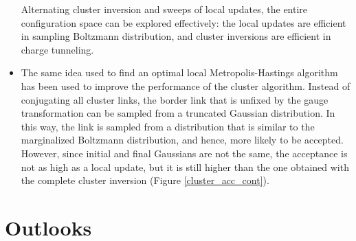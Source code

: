 \begin{itemize}
        Alternating cluster inversion and sweeps of local updates, the entire configuration space can be explored effectively:
        the local updates are efficient in sampling Boltzmann distribution, and cluster inversions are efficient in charge tunneling.
    \item
        The same idea used to find an optimal local Metropolis-Hastings algorithm has been used to improve the performance of the cluster algorithm.
        Instead of conjugating all cluster links, the border link that is unfixed by the gauge transformation can be sampled from a truncated Gaussian distribution.
        In this way, the link is sampled from a distribution that is similar to the marginalized Boltzmann distribution, and hence, more likely to be accepted.
        However, since initial and final Gaussians are not the same, the acceptance is not as high as a local update,
        but it is still higher than the one obtained with the complete cluster inversion (Figure \ref{cluster_acc_cont}).

\end{itemize}


\section{Outlooks}

